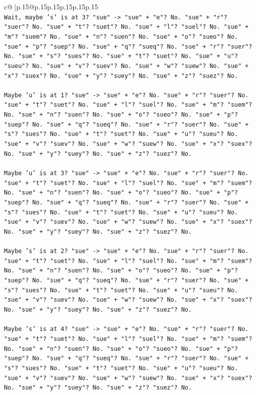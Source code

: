 \documentclass{article}
\begin{document}
{\begin{supertabular}{c@{$\;$}|p{.15\linewidth}@{}p{.15\linewidth}p{.15\linewidth}p{.15\linewidth}p{.15\linewidth}p{.15\linewidth}}
{{{\\ 
\texttt{Wait, maybe 's' is at 3? "sue" {-}> "sue" + "e"? No. "sue" + "r"? "suer"? No. "sue" + "t"? "suet"? No. "sue" + "l"? "suel"? No. "sue" + "m"? "suem"? No. "sue" + "n"? "suen"? No. "sue" + "o"? "sueo"? No. "sue" + "p"? "suep"? No. "sue" + "q"? "sueq"? No. "sue" + "r"? "suer"? No. "sue" + "s"? "sues"? No. "sue" + "t"? "suet"? No. "sue" + "u"? "sueu"? No. "sue" + "v"? "suev"? No. "sue" + "w"? "suew"? No. "sue" + "x"? "suex"? No. "sue" + "y"? "suey"? No. "sue" + "z"? "suez"? No.} \\
\\ 
\texttt{Maybe 'u' is at 1? "sue" {-}> "sue" + "e"? No. "sue" + "r"? "suer"? No. "sue" + "t"? "suet"? No. "sue" + "l"? "suel"? No. "sue" + "m"? "suem"? No. "sue" + "n"? "suen"? No. "sue" + "o"? "sueo"? No. "sue" + "p"? "suep"? No. "sue" + "q"? "sueq"? No. "sue" + "r"? "suer"? No. "sue" + "s"? "sues"? No. "sue" + "t"? "suet"? No. "sue" + "u"? "sueu"? No. "sue" + "v"? "suev"? No. "sue" + "w"? "suew"? No. "sue" + "x"? "suex"? No. "sue" + "y"? "suey"? No. "sue" + "z"? "suez"? No.} \\
\\ 
\texttt{Maybe 'u' is at 3? "sue" {-}> "sue" + "e"? No. "sue" + "r"? "suer"? No. "sue" + "t"? "suet"? No. "sue" + "l"? "suel"? No. "sue" + "m"? "suem"? No. "sue" + "n"? "suen"? No. "sue" + "o"? "sueo"? No. "sue" + "p"? "suep"? No. "sue" + "q"? "sueq"? No. "sue" + "r"? "suer"? No. "sue" + "s"? "sues"? No. "sue" + "t"? "suet"? No. "sue" + "u"? "sueu"? No. "sue" + "v"? "suev"? No. "sue" + "w"? "suew"? No. "sue" + "x"? "suex"? No. "sue" + "y"? "suey"? No. "sue" + "z"? "suez"? No.} \\
\\ 
\texttt{Maybe 's' is at 2? "sue" {-}> "sue" + "e"? No. "sue" + "r"? "suer"? No. "sue" + "t"? "suet"? No. "sue" + "l"? "suel"? No. "sue" + "m"? "suem"? No. "sue" + "n"? "suen"? No. "sue" + "o"? "sueo"? No. "sue" + "p"? "suep"? No. "sue" + "q"? "sueq"? No. "sue" + "r"? "suer"? No. "sue" + "s"? "sues"? No. "sue" + "t"? "suet"? No. "sue" + "u"? "sueu"? No. "sue" + "v"? "suev"? No. "sue" + "w"? "suew"? No. "sue" + "x"? "suex"? No. "sue" + "y"? "suey"? No. "sue" + "z"? "suez"? No.} \\
\\ 
\texttt{Maybe 's' is at 4? "sue" {-}> "sue" + "e"? No. "sue" + "r"? "suer"? No. "sue" + "t"? "suet"? No. "sue" + "l"? "suel"? No. "sue" + "m"? "suem"? No. "sue" + "n"? "suen"? No. "sue" + "o"? "sueo"? No. "sue" + "p"? "suep"? No. "sue" + "q"? "sueq"? No. "sue" + "r"? "suer"? No. "sue" + "s"? "sues"? No. "sue" + "t"? "suet"? No. "sue" + "u"? "sueu"? No. "sue" + "v"? "suev"? No. "sue" + "w"? "suew"? No. "sue" + "x"? "suex"? No. "sue" + "y"? "suey"? No. "sue" + "z"? "suez"? No.} \\
}}}
\end{supertabular}}
\end{document}
